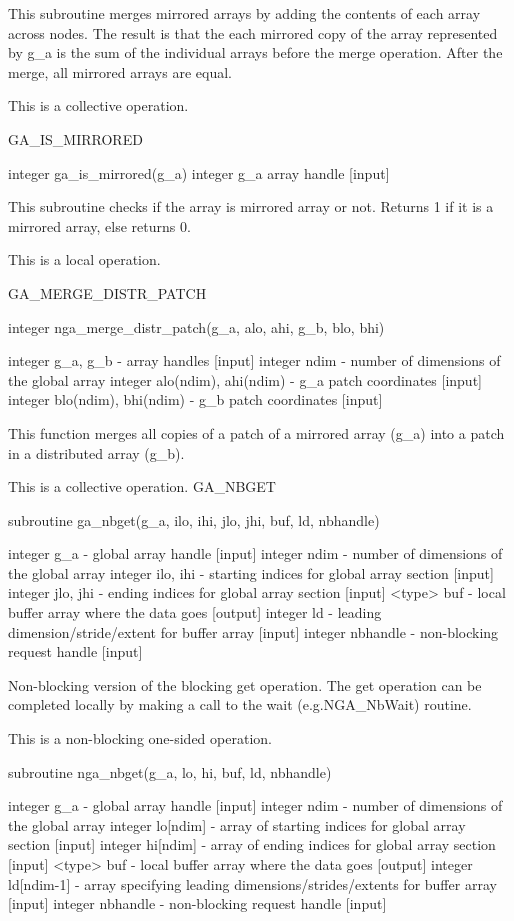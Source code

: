 This subroutine merges mirrored arrays by adding the contents of each
array across nodes. The result is that the each mirrored copy of the
array represented by g\_a is the sum of the individual arrays before
the merge operation. After the merge, all mirrored arrays are equal.

This is a collective operation.

GA\_IS\_MIRRORED

integer ga\_is\_mirrored(g\_a) integer g\_a array handle {[}input{]}

This subroutine checks if the array is mirrored array or not. Returns
1 if it is a mirrored array, else returns 0.

This is a local operation.

GA\_MERGE\_DISTR\_PATCH

integer nga\_merge\_distr\_patch(g\_a, alo, ahi, g\_b, blo, bhi)

integer g\_a, g\_b - array handles {[}input{]} integer ndim - number
of dimensions of the global array integer alo(ndim), ahi(ndim) - g\_a
patch coordinates {[}input{]} integer blo(ndim), bhi(ndim) - g\_b
patch coordinates {[}input{]}

This function merges all copies of a patch of a mirrored array (g\_a)
into a patch in a distributed array (g\_b).

This is a collective operation. GA\_NBGET

subroutine ga\_nbget(g\_a, ilo, ihi, jlo, jhi, buf, ld, nbhandle)

integer g\_a - global array handle {[}input{]} integer ndim - number
of dimensions of the global array integer ilo, ihi - starting indices
for global array section {[}input{]} integer jlo, jhi - ending indices
for global array section {[}input{]} <type> buf - local buffer array
where the data goes {[}output{]} integer ld - leading dimension/stride/extent
for buffer array {[}input{]} integer nbhandle - non-blocking request
handle {[}input{]}

Non-blocking version of the blocking get operation. The get operation
can be completed locally by making a call to the wait (e.g.NGA\_NbWait)
routine.

This is a non-blocking one-sided operation.

subroutine nga\_nbget(g\_a, lo, hi, buf, ld, nbhandle)

integer g\_a - global array handle {[}input{]} integer ndim - number
of dimensions of the global array integer lo{[}ndim{]} - array of
starting indices for global array section {[}input{]} integer hi{[}ndim{]}
- array of ending indices for global array section {[}input{]} <type>
buf - local buffer array where the data goes {[}output{]} integer
ld{[}ndim-1{]} - array specifying leading dimensions/strides/extents
for buffer array {[}input{]} integer nbhandle - non-blocking request
handle {[}input{]}

